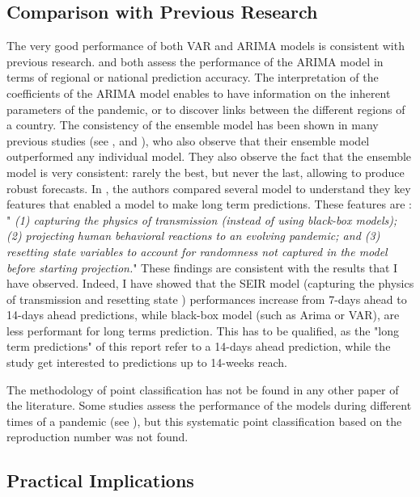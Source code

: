 \subsection{Comparison with Previous Research}

The very good performance of both VAR and ARIMA models is consistent with previous research. 
\cite{kufel2020arima} and \cite{shang2021regional} both assess the performance of the ARIMA model in terms of regional or national prediction accuracy. 
The interpretation of the coefficients of the ARIMA model enables to have information on the inherent parameters of the pandemic, or to discover links between the different regions of a country. 
The consistency of the ensemble model has been shown in many previous studies (see \cite{cramer2022evaluation}, \cite{VIBOUD201813} and \cite{reich2019accuracy}), who also observe that their ensemble model outperformed any individual model. 
They also observe the fact that the ensemble model is very consistent: rarely the best, but never the last, allowing to produce robust forecasts. 
In \cite{rahmandad2022enhancing}, the authors compared several model to understand they key features that enabled a model to make long term predictions. 
These features are : " \textit{(1) capturing the physics of transmission (instead of using black-box models); (2) projecting human behavioral reactions to an evolving pandemic; and (3) resetting state variables to account for randomness not captured in the model before starting projection.}"
These findings are consistent with the results that I have observed. 
Indeed, I have showed that the SEIR model (capturing the physics of transmission and resetting state ) performances increase from 7-days ahead to 14-days ahead predictions, while black-box model (such as Arima or VAR), are less performant for long terms prediction. 
This has to be qualified, as the "long term predictions" of this report refer to a 14-days ahead prediction, while the study \cite{rahmandad2022enhancing} get interested to predictions up to 14-weeks reach. 

The methodology of point classification has not be found in any other paper of the literature. 
Some studies assess the performance of the models during different times of a pandemic (see \cite{howerton2023evaluation}), but this systematic point classification based on the reproduction number was not found. 

\subsection{Practical Implications}

